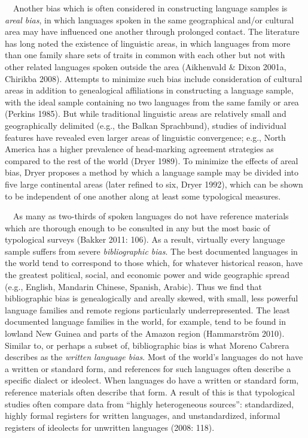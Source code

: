 \documentclass[12pt]{article}
\newenvironment{styleBody}{\renewcommand\baselinestretch{1.0}\setlength\leftskip{0in}\setlength\rightskip{0in plus 1fil}\setlength\parindent{0in}\setlength\parfillskip{0pt plus 1fil}\setlength\parskip{0in plus 1pt}\writerlistparindent\writerlistleftskip\leavevmode\normalfont\normalsize\fontsize{11pt}{13.2pt}\selectfont\mdseries\upshape\writerlistlabel\ignorespaces}{\unskip\vspace{0in plus 1pt}\par}
\newcommand\writerlistleftskip{}
\newcommand\writerlistparindent{}
\newcommand\writerlistlabel{}
\begin{document}
\begin{styleBody}
\ \ Another bias which is often considered in constructing language samples is \textit{areal bias}, in which languages spoken in the same geographical and/or cultural area may have influenced one another through prolonged contact. The literature has long noted the existence of linguistic areas, in which languages from more than one family share sets of traits in common with each other but not with other related languages spoken outside the area (Aikhenvald \& Dixon 2001a, Chirikba 2008). Attempts to minimize such bias include consideration of cultural areas in addition to genealogical affiliations in constructing a language sample, with the ideal sample containing no two languages from the same family or area (Perkins 1985). But while traditional linguistic areas are relatively small and geographically delimited (e.g., the Balkan Sprachbund), studies of individual features have revealed even larger areas of linguistic convergence; e.g., North America has a higher prevalence of head-marking agreement strategies as compared to the rest of the world (Dryer 1989). To minimize the effects of areal bias, Dryer proposes a method by which a language sample may be divided into five large continental areas (later refined to six, Dryer 1992), which can be shown to be independent of one another along at least some typological measures.
\end{styleBody}

\begin{styleBody}
\ \ As many as two-thirds of spoken languages do not have reference materials which are thorough enough to be consulted in any but the most basic of typological surveys (Bakker 2011: 106). As a result, virtually every language sample suffers from severe \textit{bibliographic bias}. The best documented languages in the world tend to correspond to those which, for whatever historical reason, have the greatest political, social, and economic power and wide geographic spread (e.g., English, Mandarin Chinese, Spanish, Arabic). Thus we find that bibliographic bias is genealogically and areally skewed, with small, less powerful language families and remote regions particularly underrepresented. The least documented language families in the world, for example, tend to be found in lowland New Guinea and parts of the Amazon region (Hammarström 2010). Similar to, or perhaps a subset of, bibliographic bias is what Moreno Cabrera describes as the \textit{written language bias}. Most of the world’s languages do not have a written or standard form, and references for such languages often describe a specific dialect or ideolect. When languages do have a written or standard form, reference materials often describe that form. A result of this is that typological studies often compare data from “highly heterogeneous sources”: standardized, highly formal registers for written languages, and unstandardized, informal registers of ideolects for unwritten languages (2008: 118).
\end{styleBody}
\end{document}
